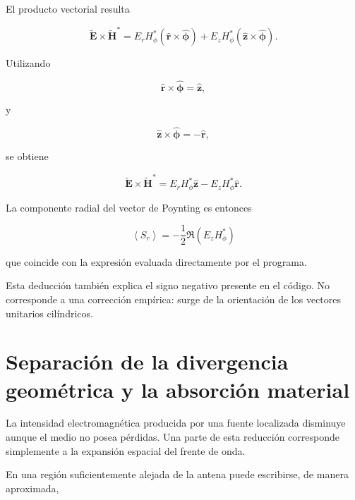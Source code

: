 El producto vectorial resulta

\begin{equation}
\widetilde{\mathbf{E}}
\times
\widetilde{\mathbf{H}}^{*}
=
E_rH_\phi^{*}
\left(
\hat{\mathbf{r}}\times\hat{\boldsymbol{\phi}}
\right)
+
E_zH_\phi^{*}
\left(
\hat{\mathbf{z}}\times\hat{\boldsymbol{\phi}}
\right).
\end{equation}

Utilizando

\begin{equation}
\hat{\mathbf{r}}\times\hat{\boldsymbol{\phi}}
=
\hat{\mathbf{z}},
\end{equation}

y

\begin{equation}
\hat{\mathbf{z}}\times\hat{\boldsymbol{\phi}}
=
-\hat{\mathbf{r}},
\end{equation}

se obtiene

\begin{equation}
\widetilde{\mathbf{E}}
\times
\widetilde{\mathbf{H}}^{*}
=
E_rH_\phi^{*}\hat{\mathbf{z}}
-
E_zH_\phi^{*}\hat{\mathbf{r}}.
\end{equation}

La componente radial del vector de Poynting es entonces

\begin{equation}
\boxed{
\left\langle
S_r
\right\rangle
=
-\frac{1}{2}
\Re
\left(
E_zH_\phi^{*}
\right)
}
\label{eq:Sr}
\end{equation}

que coincide con la expresión evaluada directamente por el programa.

Esta deducción también explica el signo negativo presente en el código. No corresponde a una corrección empírica: surge de la orientación de los vectores unitarios cilíndricos.

\section{Separación de la divergencia geométrica y la absorción material}

La intensidad electromagnética producida por una fuente localizada disminuye aunque el medio no posea pérdidas. Una parte de esta reducción corresponde simplemente a la expansión espacial del frente de onda.

En una región suficientemente alejada de la antena puede escribirse, de manera aproximada,

